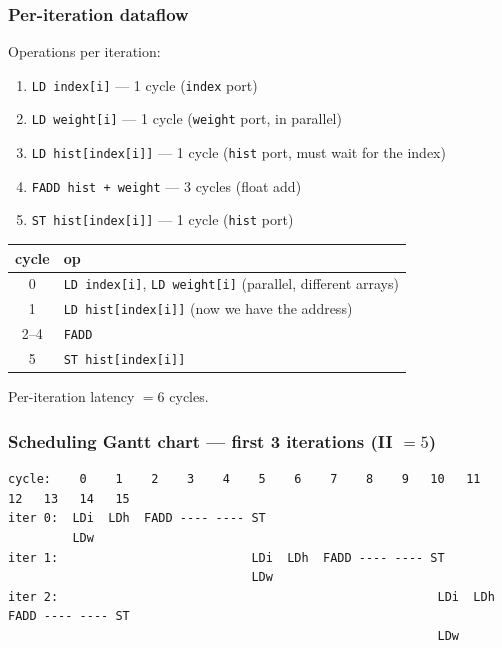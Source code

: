 \documentclass[11pt,a4paper]{article}
\begin{document}
\subsubsection*{Per-iteration dataflow}

Operations per iteration:

\begin{enumerate}[noitemsep]
  \item \texttt{LD index[i]}        --- 1 cycle (\texttt{index} port)
  \item \texttt{LD weight[i]}       --- 1 cycle (\texttt{weight} port, in parallel)
  \item \texttt{LD hist[index[i]]}  --- 1 cycle (\texttt{hist} port, must wait for the index)
  \item \texttt{FADD hist + weight} --- 3 cycles (float add)
  \item \texttt{ST hist[index[i]]}  --- 1 cycle (\texttt{hist} port)
\end{enumerate}

\begin{center}
\begin{tabular}{cl}
\toprule
cycle & op \\
\midrule
0      & \texttt{LD index[i]}, \texttt{LD weight[i]} (parallel, different arrays) \\
1      & \texttt{LD hist[index[i]]} (now we have the address) \\
2--4   & \texttt{FADD} \\
5      & \texttt{ST hist[index[i]]} \\
\bottomrule
\end{tabular}
\end{center}

Per-iteration latency $= 6$ cycles.

\subsubsection*{Scheduling Gantt chart --- first 3 iterations (II $=5$)}

\begin{lstlisting}[style=schedule]
cycle:    0    1    2    3    4    5    6    7    8    9   10   11   12   13   14   15
iter 0:  LDi  LDh  FADD ---- ---- ST
         LDw
iter 1:                           LDi  LDh  FADD ---- ---- ST
                                  LDw
iter 2:                                                     LDi  LDh  FADD ---- ---- ST
                                                            LDw
\end{lstlisting}
\end{document}
